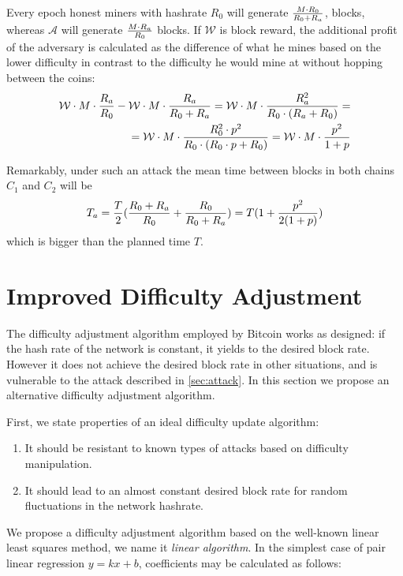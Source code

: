 \documentclass[]{llncs}
\newcommand{\reward}{\mathcal{W}}
\newcommand{\coinA}{$C_1$}
\newcommand{\coinB}{$C_2$}
\begin{document}
Every epoch honest miners with hashrate $R_0$ will generate $M \cdot R_0 \over R_0 + R_a$, blocks, whereas $\mathcal{A}$ will generate $M \cdot R_a \over R_0$ blocks.
If $\reward$ is block reward, the additional profit of the adversary is calculated as the difference of what he mines based on the lower difficulty in contrast to the difficulty he would mine at without hopping between the coins:
$$
\begin{aligned}
{\reward \cdot M \cdot { R_a \over R_0} - \reward \cdot M \cdot { R_a \over R_0 + R_a}}  
= {\reward \cdot M \cdot { R_a^2 \over R_0 \cdot (R_a + R_0) }} = \\
= {\reward \cdot M \cdot {R_0^2 \cdot p^2 \over R_0 \cdot (R_0 \cdot p + R_0)}} 
= {\reward \cdot M \cdot { p^2 \over 1+p }}
\end{aligned}
$$

Remarkably, under such an attack the mean time between blocks in both chains \coinA{} and \coinB{} will be
\begin{equation}
\label{eq:ati}
{T_a={T\over 2}({R_0+R_a\over R_0} + {R_0 \over R_0+R_a}) = T(1 + {p^2\over 2(1+p)})}
\end{equation}
which is bigger than the planned time $T$.


\section{Improved Difficulty Adjustment}
\label{sec:improved}

The difficulty adjustment algorithm employed by Bitcoin works as designed: if the hash rate of the network is constant, it yields to the desired block rate. However it does not achieve the desired block rate in other situations, and is vulnerable to the attack described in \ref{sec:attack}.
In this section we propose an alternative difficulty adjustment algorithm.

First, we state properties of an ideal difficulty update algorithm:
\begin{enumerate}
\item{It should be resistant to known types of attacks based on difficulty manipulation.}
\item{It should lead to an almost constant desired block rate for random fluctuations in the network hashrate.}
\end{enumerate}


We propose a difficulty adjustment algorithm based on the well-known linear least squares method\cite{lawson1974solving}, we name it {\em linear algorithm}. In the simplest case of pair linear regression $y=kx+b$, coefficients may be calculated as follows:
\end{document}
